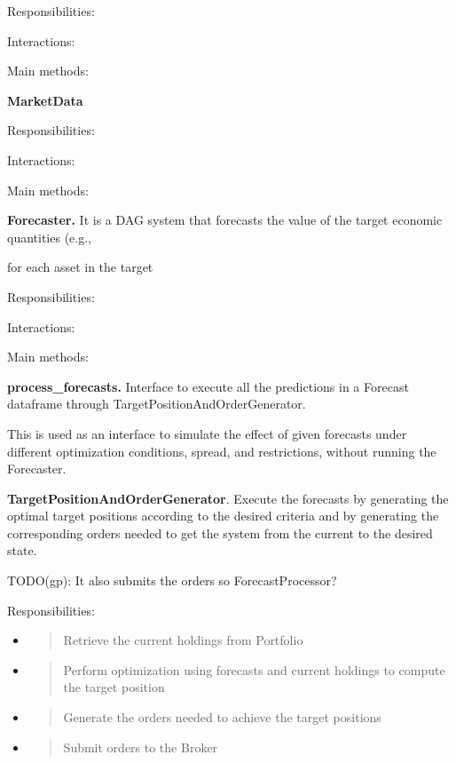 \documentclass[11pt, reqno]{amsart}
\begin{document}
Responsibilities:

Interactions:

Main methods:

\textbf{MarketData}

Responsibilities:

Interactions:

Main methods:

\textbf{Forecaster.} It is a DAG system that forecasts the value of the
target economic quantities (e.g.,

for each asset in the target

Responsibilities:

Interactions:

Main methods:

\textbf{process\_forecasts.} Interface to execute all the predictions in
a Forecast dataframe through TargetPositionAndOrderGenerator.

This is used as an interface to simulate the effect of given forecasts
under different optimization conditions, spread, and restrictions,
without running the Forecaster.

\textbf{TargetPositionAndOrderGenerator}. Execute the forecasts by
generating the optimal target positions according to the desired
criteria and by generating the corresponding orders needed to get the
system from the current to the desired state.

TODO(gp): It also submits the orders so ForecastProcessor?

Responsibilities:

\begin{itemize}
\item
  \begin{quote}
  Retrieve the current holdings from Portfolio
  \end{quote}
\item
  \begin{quote}
  Perform optimization using forecasts and current holdings to compute
  the target position
  \end{quote}
\item
  \begin{quote}
  Generate the orders needed to achieve the target positions
  \end{quote}
\item
  \begin{quote}
  Submit orders to the Broker
  \end{quote}
\end{itemize}
\end{document}
